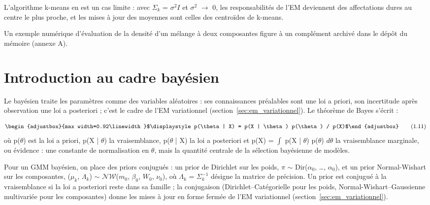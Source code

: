 \label{sec:relation_entre_gmm_et_k}L'algorithme k-means en est un cas limite : avec $\Sigma _{k}$ = $\sigma ^{2}I$ et $\sigma ^{2}$ $\to $ 0, les responsabilités de l'EM deviennent des affectations dures au centre le plus proche, et les mises à jour des moyennes sont celles des centroïdes de k-means.

Un exemple numérique d'évaluation de la densité d'un mélange à deux composantes figure à un complément archivé dans le dépôt du mémoire (annexe A).

\section{Introduction au cadre bayésien}\label{sec:introduction_au_cadre_bayesien}
\label{sec:la_philosophie_bayesienne}\label{sec:le_theoreme_de_bayes_et}Le bayésien traite les paramètres comme des variables aléatoires : ses connaissances préalables sont une loi a priori, son incertitude après observation une loi a posteriori ; c'est le cadre de l'EM variationnel (section~\ref{sec:em_variationnel}). Le théorème de Bayes s'écrit :

\begin{equation}
\begin{adjustbox}{max width=0.92\linewidth}$\displaystyle p(\theta | X) = p(X | \theta ) p(\theta ) / p(X)$\end{adjustbox}
\tag{1.11}
\label{eq:1_11}
\end{equation}
où p($\theta $) est la loi a priori, p(X | $\theta $) la vraisemblance, p($\theta $ | X) la loi a posteriori et p(X) = $\int $ p(X | $\theta $) p($\theta $) $d\theta $ la vraisemblance marginale, ou évidence : une constante de normalisation en $\theta $, mais la quantité centrale de la sélection bayésienne de modèles.

Pour un GMM bayésien, on place des priors conjugués : un prior de Dirichlet sur les poids, $\pi $ $\sim $ Dir($\alpha _{0}$, \ldots{}, $\alpha _{0}$), et un prior Normal-Wishart sur les composantes, ($\mu _{k}$, $\Lambda _{k}$) $\sim $ $\mathcal{N}\mathcal{W}$($m_{0}$, $\beta _{0}$, $W_{0}$, $\nu _{0}$), où $\Lambda _{k}$ = $\Sigma _{k}^{-1}$ désigne la matrice de précision. \label{sec:distributions_conjuguees}Un prior est conjugué à la vraisemblance si la loi a posteriori reste dans sa famille ; la conjugaison (Dirichlet--Catégorielle pour les poids, Normal-Wishart--Gaussienne multivariée pour les composantes) donne les mises à jour en forme fermée de l'EM variationnel (section~\ref{sec:em_variationnel}).

